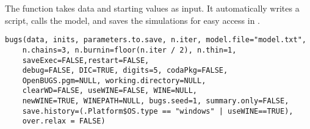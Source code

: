 %
\begin{Description}\relax
The  function takes data and starting values as
input.  It automatically writes a  script, calls the model, and
saves the simulations for easy access in \R{}.
\end{Description}
%
\begin{Usage}
\begin{verbatim}
bugs(data, inits, parameters.to.save, n.iter, model.file="model.txt",
    n.chains=3, n.burnin=floor(n.iter / 2), n.thin=1,
    saveExec=FALSE,restart=FALSE,
    debug=FALSE, DIC=TRUE, digits=5, codaPkg=FALSE,
    OpenBUGS.pgm=NULL, working.directory=NULL,
    clearWD=FALSE, useWINE=FALSE, WINE=NULL,
    newWINE=TRUE, WINEPATH=NULL, bugs.seed=1, summary.only=FALSE,
    save.history=(.Platform$OS.type == "windows" | useWINE==TRUE),
    over.relax = FALSE)
\end{verbatim}
\end{Usage}
%
